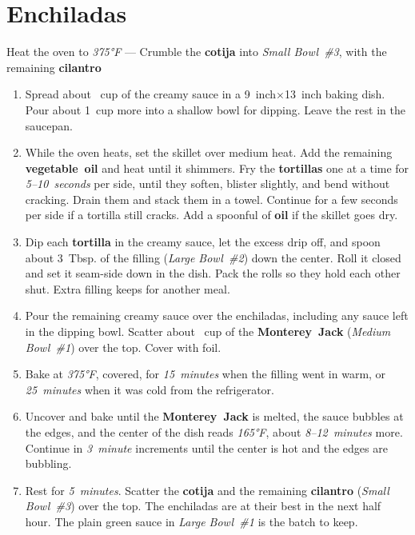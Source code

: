 \documentclass[11pt,letterpaper]{article}
\begin{document}
\filbreak
\section*{Enchiladas}

\noindent
Heat the oven to \textit{375°F} ---
Crumble the \textbf{cotija} into \textit{Small Bowl~\#3}, with the remaining \textbf{cilantro}

\begin{enumerate}
    \item Spread about ~cup of the creamy sauce in a 9~inch$\times$13~inch baking dish. Pour about 1~cup more into a shallow bowl for dipping. Leave the rest in the saucepan.

    \item While the oven heats, set the skillet over medium heat. Add the remaining \textbf{vegetable~oil} and heat until it shimmers. Fry the \textbf{tortillas} one at a time for \textit{5--10~seconds} per side, until they soften, blister slightly, and bend without cracking. Drain them and stack them in a towel. Continue for a few seconds per side if a tortilla still cracks. Add a spoonful of \textbf{oil} if the skillet goes dry.

    \item Dip each \textbf{tortilla} in the creamy sauce, let the excess drip off, and spoon about 3~Tbsp. of the filling (\textit{Large Bowl~\#2}) down the center. Roll it closed and set it seam-side down in the dish. Pack the rolls so they hold each other shut. Extra filling keeps for another meal.

    \item Pour the remaining creamy sauce over the enchiladas, including any sauce left in the dipping bowl. Scatter about ~cup of the \textbf{Monterey~Jack} (\textit{Medium Bowl~\#1}) over the top. Cover with foil.

    \item Bake at \textit{375°F}, covered, for \textit{15~minutes} when the filling went in warm, or \textit{25~minutes} when it was cold from the refrigerator.

    \item Uncover and bake until the \textbf{Monterey~Jack} is melted, the sauce bubbles at the edges, and the center of the dish reads \textit{165°F}, about \textit{8--12~minutes} more. Continue in \textit{3~minute} increments until the center is hot and the edges are bubbling.

    \item Rest for \textit{5~minutes}. Scatter the \textbf{cotija} and the remaining \textbf{cilantro} (\textit{Small Bowl~\#3}) over the top. The enchiladas are at their best in the next half hour. The plain green sauce in \textit{Large Bowl~\#1} is the batch to keep.
\end{enumerate}
\end{document}
